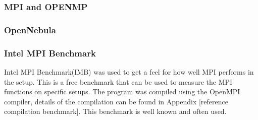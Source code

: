 \subsubsection{MPI and OPENMP}

\subsubsection{OpenNebula}

\subsubsection{Intel MPI Benchmark}
Intel MPI Benchmark(IMB) was used to get a feel for how well MPI performs in the setup. This is a free benchmark that can be used to measure the MPI functions on specific setups. The program was compiled using the OpenMPI compiler, details of the compilation can be found in Appendix [reference compilation benchmark]. This benchmark is well known and often used. 
